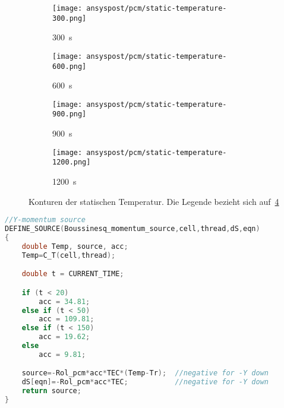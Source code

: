 \begin{figure}[H]
\begin{minipage}[t]{0.485\textwidth}
\begin{subfigure}[t]{0.16\textwidth}
        \end{subfigure}%
        \hspace{2mm}%
        \begin{subfigure}[t]{0.2\textwidth}
            \centering
            \texttt{[image: ansyspost/pcm/static-temperature-300.png]}
            \caption{\SI{300}{\second}}\label{fig:temperatur_300}
        \end{subfigure}%
        \begin{subfigure}[t]{0.2\textwidth}
            \centering
            \texttt{[image: ansyspost/pcm/static-temperature-600.png]}
            \caption{\SI{600}{\second}}\label{fig:temperatur_600}
        \end{subfigure}%
        \begin{subfigure}[t]{0.2\textwidth}
            \centering
            \texttt{[image: ansyspost/pcm/static-temperature-900.png]}
            \caption{\SI{900}{\second}}\label{fig:temperatur_900}
        \end{subfigure}%
        \begin{subfigure}[t]{0.2\textwidth}
            \centering
            \texttt{[image: ansyspost/pcm/static-temperature-1200.png]}
            \caption{\SI{1200}{\second}}\label{fig:temperatur_1200}
        \end{subfigure}
        \caption{Konturen der statischen Temperatur. Die Legende bezieht sich auf~\ref{fig:temperatur_1200}}
        \label{fig:static_temperature_kontur}
    \end{minipage}

\end{figure}


\begin{lstlisting}[language=C, float, caption={Boussinesq-Approximation des Auftriebs im \ac{pcm} in der \ac{udf} eicosane.c}, label={lst:udf_bossinesque}]
//Y-momentum source
DEFINE_SOURCE(Boussinesq_momentum_source,cell,thread,dS,eqn)
{
	double Temp, source, acc;
	Temp=C_T(cell,thread);

	double t = CURRENT_TIME;

	if (t < 20)
		acc = 34.81;
	else if (t < 50)
		acc = 109.81;
	else if (t < 150)
		acc = 19.62;
	else
		acc = 9.81;

	source=-Rol_pcm*acc*TEC*(Temp-Tr);  //negative for -Y down
	dS[eqn]=-Rol_pcm*acc*TEC; 			//negative for -Y down
	return source;
}
\end{lstlisting}

